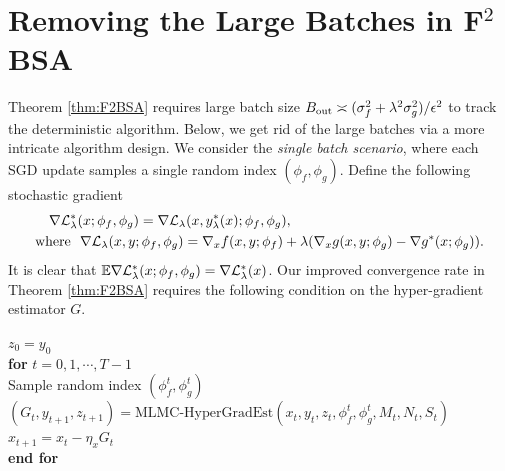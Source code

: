 {
\section{Removing the Large Batches in F${}^2$BSA} \label{apx:single-batch}

Theorem \ref{thm:F2BSA} requires large batch size $B_{\rm out} \asymp (\sigma_f^2 + \lambda^2 \sigma_g^2) / \epsilon^2$ to track the deterministic algorithm. Below, we 
get rid of the large batches via a more intricate algorithm design. 
We consider the \textit{single batch scenario}, where
each SGD update samples a single random index $(\phi_f, \phi_g)$. Define the following stochastic gradient
\begin{align}
\begin{split}
    &\quad \nabla {\mathcal{L}}_{\lambda}^*(x; \phi_f, \phi_g) =  \nabla {\mathcal{L}}_{\lambda}(x, y_{\lambda}^*(x); \phi_f, \phi_g), \\
    &{\rm where}~~ \nabla {\mathcal{L}}_{\lambda}(x, y; \phi_f, \phi_g) = \nabla_x f(x,y; \phi_f) + \lambda (\nabla_x g(x,y; \phi_g) - \nabla g^*(x; \phi_g)).
\end{split}
\end{align}
It is clear that ${\mathbb{E}} \nabla {\mathcal{L}}_{\lambda}^*(x; \phi_f, \phi_g) = \nabla {\mathcal{L}}_{\lambda}^*(x)$. 
Our improved convergence rate in Theorem \ref{thm:F2BSA} requires the following condition on the hyper-gradient estimator $G$.

\begin{algorithm*}[t]  
\caption{F${}^3$BSA$(x, y_0)$} \label{alg:F3BSA}
\begin{algorithmic}[1]
\STATE $z_0 = y_0$ \\[1mm]
\STATE \textbf{for} $ t=0,1,\cdots,T-1$ \\[1mm]
\STATE \quad Sample random index $(\phi_f^t, \phi_g^t)$ \\[1mm]
\STATE \quad $(G_t, y_{t+1} , z_{t+1}) = \text{MLMC-HyperGradEst}(x_t, y_t, z_t, \phi_f^t, \phi_g^t, M_t, N_t, S_t )$ \\[1mm]
\STATE \quad $x_{t+1} = x_t - \eta_x G_t$ \\[1mm]
\STATE \textbf{end for} 
\end{algorithmic}
\end{algorithm*}
\begin{algorithm*}[t]  


\end{algorithm*}}
